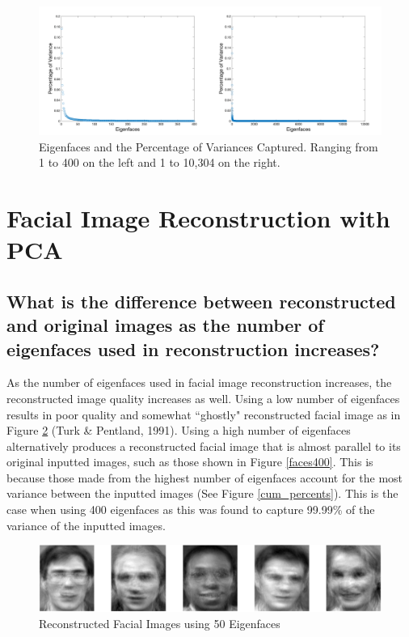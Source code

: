 \documentclass[letterpaper,12pt]{article}
\begin{document}
\begin{figure}[htp]
    \centering
    \includegraphics[width=15cm]{graphs2.png}
    \caption{Eigenfaces and the Percentage of Variances Captured. Ranging from 1 to 400 on the left and 1 to 10,304 on the right.}
    \label{cum_percents2}
\end{figure}

\section{Facial Image Reconstruction with PCA}\label{Q2}


\subsection{What is the difference between reconstructed and original images as the number of eigenfaces used in reconstruction increases?}\label{Q2.1}

As the number of eigenfaces used in facial image reconstruction increases, the reconstructed image quality increases as well. Using a low number of eigenfaces results in poor quality and somewhat ``ghostly" reconstructed facial image as in Figure \ref{faces50}  (Turk \& Pentland, 1991). Using a high number of eigenfaces alternatively produces a reconstructed facial image that is almost parallel to its original inputted images, such as those shown in Figure \ref{faces400}. This is because those made from the highest number of eigenfaces account for the most variance between the inputted images (See Figure \ref{cum_percents}).  This is the case when using 400 eigenfaces as this was found to capture 99.99\% of the variance of the inputted images. 




\begin{figure}[htp]
    \centering
    \includegraphics[width=15cm]{faces50.png}
    \caption{Reconstructed Facial Images using 50 Eigenfaces}
    \label{faces50}
\end{figure}
\end{document}
